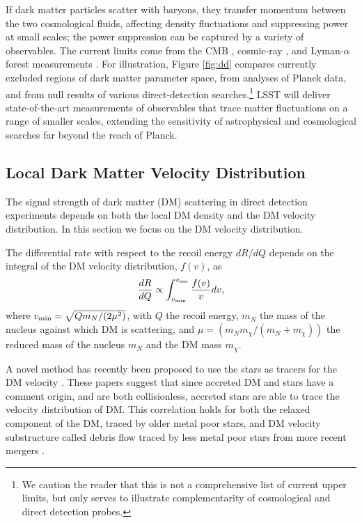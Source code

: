 If dark matter particles scatter with baryons, they transfer momentum between the two cosmological fluids, affecting density fluctuations and suppressing power at small scales; the power suppression can be captured by a variety of observables. The current limits come from the CMB \citep{Gluscevic:2017ywp}, cosmic-ray \citep{Cappiello:2018hsu}, and Lyman-$\alpha$ forest measurements \cite{Xu:2018efh}. For illustration, Figure \ref{fig:dd} compares currently excluded regions of dark matter parameter space, from analyses of Planck data, and from null results of various direct-detection searches.\footnote{We caution the reader that this is not a comprehensive list of current upper limits, but only serves to illustrate complementarity of cosmological and direct detection probes.} LSST will deliver state-of-the-art measurements of observables that trace matter fluctuations on a range of smaller scales, extending the sensitivity of astrophysical and cosmological searches far beyond the reach of Planck.

\subsection{Local Dark Matter Velocity Distribution }


The signal strength of dark matter (DM) scattering in direct detection experiments depends on both the local DM density and the DM velocity distribution. In this section we focus on the DM velocity distribution.

The differential rate with respect to the recoil energy $dR/dQ$ depends on the integral of the DM velocity distribution, $f(v)$, as
\begin{equation}
    \frac{dR}{dQ} \propto \int_{v_{\rm{min}}}^{v_{\rm{esc}}} \frac{f(v)}{v} dv, 
\end{equation}
where $v_{\rm{min}} = \sqrt{Q m_N/ (2 \mu^2)}$, with $Q$ the recoil energy, $m_N$ the mass of the nucleus against which DM is scattering, and $\mu = (m_N m_\chi / (m_N + m_\chi))$ the reduced mass of the nucleus $m_N$ and the DM mass $m_\chi$.

A novel method has recently been proposed to use the stars as tracers for the DM velocity \citep{Herzog-Arbeitman:2017fte,Necib:2018b}. These papers suggest that since accreted DM and stars have a comment origin, and are both collisionless, accreted stars are able to trace the velocity distribution of DM. This correlation holds for both the relaxed component of the DM, traced by older metal poor stars, and DM velocity substructure called debris flow traced by less metal poor stars from more recent mergers \citep{Lisanti:2011as,Kuhlen:2012fz,Lisanti:2014dva}. 

